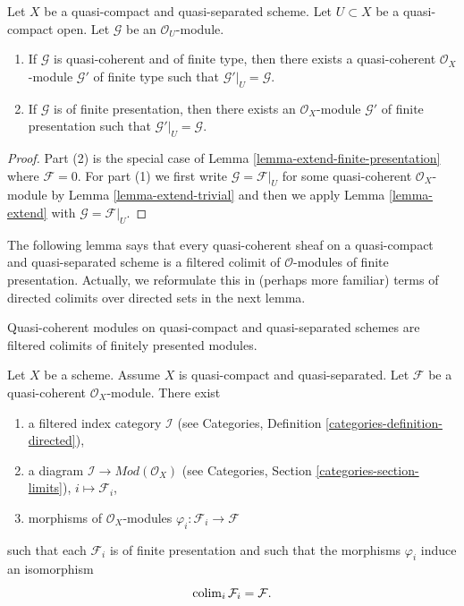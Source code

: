 \begin{lemma}
\label{lemma-lift-finite-presentation}
Let $X$ be a quasi-compact and quasi-separated scheme. Let $U \subset X$
be a quasi-compact open. Let $\mathcal{G}$ be an $\mathcal{O}_U$-module.
\begin{enumerate}
\item If $\mathcal{G}$ is quasi-coherent and of finite type, then
there exists a quasi-coherent $\mathcal{O}_X$-module $\mathcal{G}'$
of finite type such that $\mathcal{G}'|_U = \mathcal{G}$.
\item If $\mathcal{G}$ is of finite presentation, then
there exists an $\mathcal{O}_X$-module $\mathcal{G}'$
of finite presentation such that $\mathcal{G}'|_U = \mathcal{G}$.
\end{enumerate}
\end{lemma}

\begin{proof}
Part (2) is the special case of Lemma \ref{lemma-extend-finite-presentation}
where $\mathcal{F} = 0$. For part (1) we first write
$\mathcal{G} = \mathcal{F}|_U$ for some quasi-coherent $\mathcal{O}_X$-module
by Lemma \ref{lemma-extend-trivial}
and then we apply Lemma \ref{lemma-extend} with $\mathcal{G} = \mathcal{F}|_U$.
\end{proof}

\noindent
The following lemma says that every quasi-coherent sheaf on a quasi-compact
and quasi-separated scheme is a filtered colimit of $\mathcal{O}$-modules
of finite presentation. Actually, we reformulate this in (perhaps more
familiar) terms of directed colimits over directed sets in the next lemma.

\begin{lemma}
\label{lemma-directed-colimit-diagram-finite-presentation}
\begin{slogan}
Quasi-coherent modules on quasi-compact and quasi-separated schemes
are filtered colimits of finitely presented modules.
\end{slogan}
Let $X$ be a scheme. Assume $X$ is quasi-compact and quasi-separated.
Let $\mathcal{F}$ be a quasi-coherent $\mathcal{O}_X$-module.
There exist
\begin{enumerate}
\item a filtered index category $\mathcal{I}$ (see
Categories, Definition \ref{categories-definition-directed}),
\item a diagram $\mathcal{I} \to \textit{Mod}(\mathcal{O}_X)$ (see
Categories, Section \ref{categories-section-limits}),
$i \mapsto \mathcal{F}_i$,
\item morphisms of $\mathcal{O}_X$-modules
$\varphi_i : \mathcal{F}_i \to \mathcal{F}$
\end{enumerate}
such that each $\mathcal{F}_i$ is of finite presentation
and such that the morphisms $\varphi_i$ induce an isomorphism
$$
\mathop{\mathrm{colim}}\nolimits_i \mathcal{F}_i
=
\mathcal{F}.
$$
\end{lemma}

